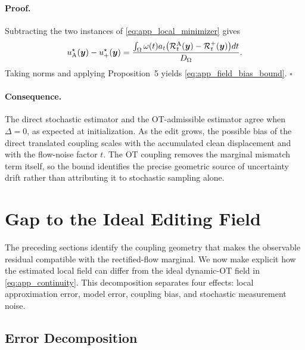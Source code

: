 \paragraph{Proof.}
Subtracting the two instances of \eqref{eq:app_local_minimizer} gives
\begin{equation}
    u_{\mathrm{A}}^\star(\boldsymbol{y})-u_+^\star(\boldsymbol{y})
    =
    \frac{
    \int_{\Omega}
    \omega(t)a_t
    \big(
    \mathcal{R}^{\mathrm{A}}_t(\boldsymbol{y})
    -
    \mathcal{R}^{+}_t(\boldsymbol{y})
    \big)dt
    }{D_{\Omega}}.
\end{equation}
Taking norms and applying Proposition~5 yields \eqref{eq:app_field_bias_bound}.
\hfill$\square$

\paragraph{Consequence.}
The direct stochastic estimator and the OT-admissible estimator agree when $\Delta=0$, as expected at initialization.
As the edit grows, the possible bias of the direct translated coupling scales with the accumulated clean displacement and with the flow-noise factor $t$.
The OT coupling removes the marginal mismatch term itself, so the bound identifies the precise geometric source of uncertainty drift rather than attributing it to stochastic sampling alone.

\section{Gap to the Ideal Editing Field}
\label{app:gap_to_ideal_field}

The preceding sections identify the coupling geometry that makes the observable residual compatible with the rectified-flow marginal.
We now make explicit how the estimated local field can differ from the ideal dynamic-OT field in \eqref{eq:app_continuity}.
This decomposition separates four effects: local approximation error, model error, coupling bias, and stochastic measurement noise.

\subsection{Error Decomposition}

